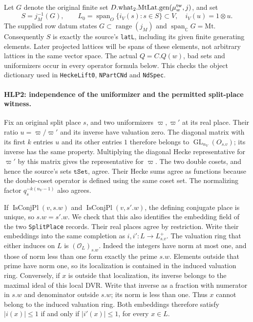 Let \(G\) denote the original finite set
\(D.\mathrm{what}_2.\mathrm{MtLat.gen}(\mu^{\rm tw}_w,j)\), and set
\[
       S=j_M^{-1}(G),\qquad
       L_0=\operatorname{span}_O\{i_V(s):s\in S\}\subset V,
       \quad i_V(u)=1\otimes u.                     \tag{HLP.1}
\]
The supplied row datum states \(G\subset\operatorname{range}(j_M)\)
and \(\operatorname{span}_{\mathbb C}G=\mathrm{Mt}\). Consequently
\(S\) is exactly the source's \texttt{latL}, including its given
finite generating elements. Later projected lattices will be spans
of these elements, not arbitrary lattices in the same vector space.
The actual \(Q=C.Q(w)\), bad sets and uniformizers occur in every
operator formula below. This checks the object dictionary used in
\texttt{HeckeLift0}, \texttt{NPartCNd} and \texttt{NdSpec}.

\paragraph{HLP2: independence of the uniformizer and the permitted split-place witness.}
\label{claim:HLP2}
Fix an original split place \(s\), and two uniformizers \(\varpi,\varpi'\)
at its real place. Their ratio \(u=\varpi/\varpi'\) and its inverse
have valuation zero. The diagonal matrix with its first \(k\) entries
\(u\) and its other entries \(1\) therefore belongs to
\(\operatorname{GL}_{n_V}(O_{s.v})\); its inverse has the same property.
Multiplying the diagonal Hecke representative for \(\varpi'\) by this
matrix gives the representative for \(\varpi\). The two double cosets,
and hence the source's sets \(\texttt{tSet}\), agree. Their Hecke sums
agree as functions because the double-coset operator is defined using
the same coset set. The normalizing factor \(q_s^{-k(n_V-1)}\) also
agrees.

If \(\operatorname{IsConjPl}(v,s.w)\) and
\(\operatorname{IsConjPl}(v,s'.w)\), the defining conjugate place is
unique, so \(s.w=s'.w\). We check that this also identifies the
embedding field of the two \texttt{SplitPlace} records. Their real
places agree by restriction. Write their embeddings into the same
completion as \(i,i':L\to L^+_{s.v}\). The valuation ring that either
induces on \(L\) is \((\mathcal O_L)_{s.w}\). Indeed the integers
have norm at most one, and those of norm less than one form exactly
the prime \(s.w\). Elements outside that prime have norm one, so
its localization is contained in the induced valuation ring.
Conversely, if \(x\) is outside that localization, its inverse
belongs to the maximal ideal of this local DVR. Write that inverse
as a fraction with numerator in \(s.w\) and denominator outside
\(s.w\); its norm is less than one. Thus \(x\) cannot belong to
the induced valuation ring. Both embeddings therefore satisfy
\(|i(x)|\le1\) if and only if \(|i'(x)|\le1\), for every \(x\in L\).

